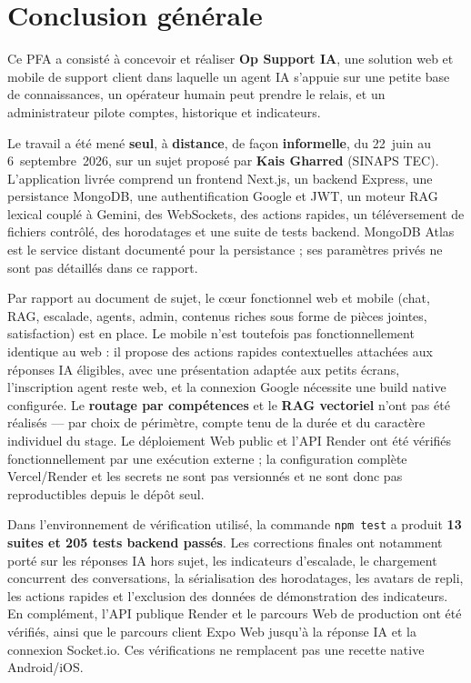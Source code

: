 \chapter*{Conclusion générale}

Ce PFA a consisté à concevoir et réaliser \textbf{Op Support IA}, une solution web et mobile de support client dans laquelle un agent IA s'appuie sur une petite base de connaissances, un opérateur humain peut prendre le relais, et un administrateur pilote comptes, historique et indicateurs.

Le travail a été mené \textbf{seul}, à \textbf{distance}, de façon \textbf{informelle}, du 22~juin au 6~septembre~2026, sur un sujet proposé par \textbf{Kais Gharred} (SINAPS TEC). L'application livrée comprend un frontend Next.js, un backend Express, une persistance MongoDB, une authentification Google et JWT, un moteur RAG lexical couplé à Gemini, des WebSockets, des actions rapides, un téléversement de fichiers contrôlé, des horodatages et une suite de tests backend. MongoDB Atlas est le service distant documenté pour la persistance ; ses paramètres privés ne sont pas détaillés dans ce rapport.

Par rapport au document de sujet, le cœur fonctionnel web et mobile (chat, RAG, escalade, agents, admin, contenus riches sous forme de pièces jointes, satisfaction) est en place. Le mobile n'est toutefois pas fonctionnellement identique au web : il propose des actions rapides contextuelles attachées aux réponses IA éligibles, avec une présentation adaptée aux petits écrans, l'inscription agent reste web, et la connexion Google nécessite une build native configurée. Le \textbf{routage par compétences} et le \textbf{RAG vectoriel} n'ont pas été réalisés --- par choix de périmètre, compte tenu de la durée et du caractère individuel du stage. Le déploiement Web public et l'API Render ont été vérifiés fonctionnellement par une exécution externe ; la configuration complète Vercel/Render et les secrets ne sont pas versionnés et ne sont donc pas reproductibles depuis le dépôt seul.

Dans l'environnement de vérification utilisé, la commande \texttt{npm test} a produit \textbf{13 suites et 205 tests backend passés}. Les corrections finales ont notamment porté sur les réponses IA hors sujet, les indicateurs d'escalade, le chargement concurrent des conversations, la sérialisation des horodatages, les avatars de repli, les actions rapides et l'exclusion des données de démonstration des indicateurs. En complément, l'API publique Render et le parcours Web de production ont été vérifiés, ainsi que le parcours client Expo Web jusqu'à la réponse IA et la connexion Socket.io. Ces vérifications ne remplacent pas une recette native Android/iOS.

